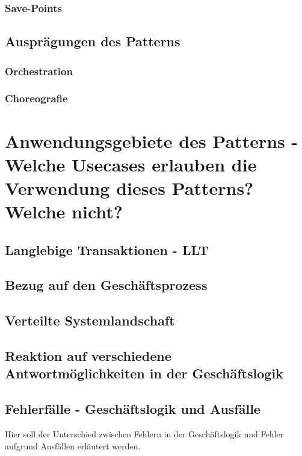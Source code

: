 \subsubsection{Save-Points}

\subsection{Ausprägungen des Patterns}
\subsubsection{Orchestration}


\subsubsection{Choreografie}

\section{Anwendungsgebiete des Patterns - Welche Usecases erlauben die Verwendung dieses Patterns? Welche nicht?}

\subsection{Langlebige Transaktionen - LLT}
\subsection{Bezug auf den Geschäftsprozess}
\subsection{Verteilte Systemlandschaft}
\subsection{Reaktion auf verschiedene Antwortmöglichkeiten in der Geschäftslogik}
\subsection{Fehlerfälle - Geschäftslogik und Ausfälle}
Hier soll der Unterschied zwischen Fehlern in der Geschäftslogik und Fehler aufgrund Ausfällen erläutert werden.

